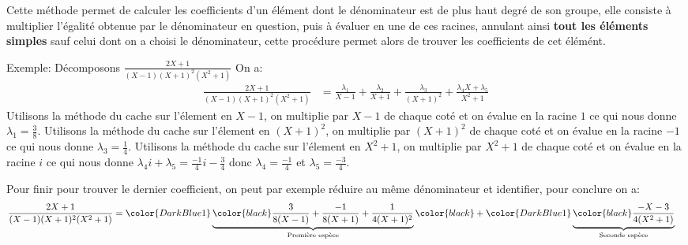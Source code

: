 Cette méthode permet de calculer les coefficients d'un élément dont le dénominateur est de plus haut degré de son groupe, elle consiste à multiplier l'égalité obtenue par le dénominateur en question, puis à évaluer en une de ces racines, annulant ainsi \textbf{tout les éléments simples} sauf celui dont on a choisi le dénominateur, cette procédure permet alors de trouver les coefficients de cet élémént.\<

\pagebreak
Exemple: Décomposons \(\frac{2X+1}{(X-1)(X+1)^2(X^2+1)}\)\+
On a:
   \begin{align*}
      \frac{2X+1}{(X-1)(X+1)^2(X^2+1)} &= \frac{\lambda_1}{X-1} + \frac{\lambda_2}{X+1}+ \frac{\lambda_3}{(X+1)^2} + \frac{\lambda_4X+ \lambda_5}{X^2+1}
   \end{align*}
Utilisons la méthode du cache sur l'élement en \(X-1\), on multiplie par \(X-1\) de chaque coté et on évalue en la racine \(1\) ce qui nous donne \(\lambda_1 = \frac{3}{8}\).\+
Utilisons la méthode du cache sur l'élement en \((X+1)^2\), on multiplie par \((X+1)^2\) de chaque coté et on évalue en la racine \(-1\) ce qui nous donne \(\lambda_3 = \frac{1}{4}\).\+
Utilisons la méthode du cache sur l'élement en \(X^2+1\), on multiplie par \(X^2+1\) de chaque coté et on évalue en la racine \(i\) ce qui nous donne \(\lambda_4i+\lambda_5 = \frac{-1}{4}i - \frac{3}{4}\) donc \(\lambda_4=\frac{-1}{4}\) et \(\lambda_5=\frac{-3}{4}\).\<

Pour finir pour trouver le dernier coefficient, on peut par exemple réduire au même dénominateur et identifier, pour conclure on a:
\begin{align*}
   \frac{2X+1}{(X-1)(X+1)^2(X^2+1)} &= \color{DarkBlue1}\underbrace{\color{black}\frac{3}{8(X-1)} + \frac{-1}{8(X+1)}+ \frac{1}{4(X+1)^2}}_\text{Première espèce} \color{black}+\color{DarkBlue1}\underbrace{\color{black} \frac{-X - 3}{4(X^2+1)}}_\text{Seconde espèce} 
\end{align*}

\subsection*{}

